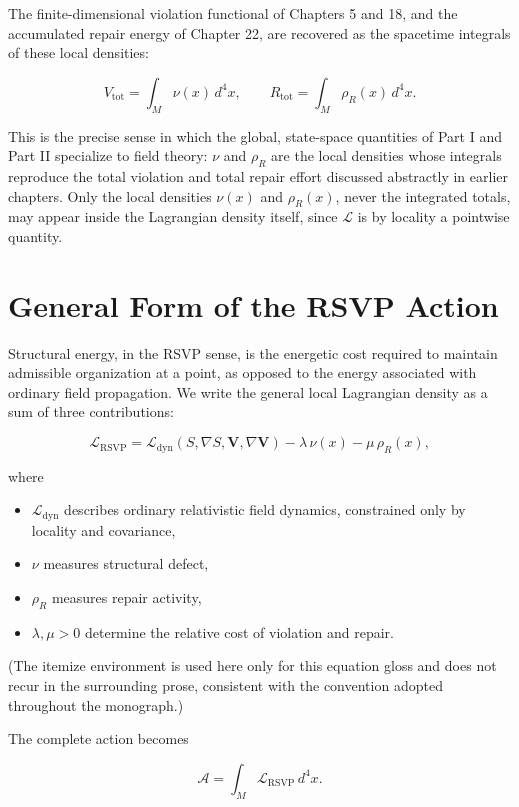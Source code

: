 \documentclass[11pt,oneside]{book}
\numberwithin{equation}{chapter}
\theoremstyle{definition}
\theoremstyle{plain}
\begin{document}
The finite-dimensional violation functional of Chapters 5 and 18, and the
accumulated repair energy of Chapter 22, are recovered as the spacetime
integrals of these local densities:

\[
\boxed{
V_{\mathrm{tot}}
=
\int_M \nu(x)\,d^4x,
\qquad
R_{\mathrm{tot}}
=
\int_M \rho_R(x)\,d^4x.
}
\]

This is the precise sense in which the global, state-space quantities of
Part I and Part II specialize to field theory: \(\nu\) and \(\rho_R\) are
the local densities whose integrals reproduce the total violation and total
repair effort discussed abstractly in earlier chapters. Only the local
densities \(\nu(x)\) and \(\rho_R(x)\), never the integrated totals, may
appear inside the Lagrangian density itself, since \(\mathcal L\) is by
locality a pointwise quantity.

\section{General Form of the RSVP Action}

Structural energy, in the RSVP sense, is the energetic cost required to
maintain admissible organization at a point, as opposed to the energy
associated with ordinary field propagation. We write the general local
Lagrangian density as a sum of three contributions:

\[
\boxed{
\mathcal L_{\mathrm{RSVP}}
=
\mathcal L_{\mathrm{dyn}}
\left(S,\nabla S,\mathbf V,\nabla\mathbf V\right)
-
\lambda\,\nu(x)
-
\mu\,\rho_R(x),
}
\]

where

\begin{itemize}
\item[] \(\mathcal L_{\mathrm{dyn}}\) describes ordinary relativistic field
dynamics, constrained only by locality and covariance,
\item[] \(\nu\) measures structural defect,
\item[] \(\rho_R\) measures repair activity,
\item[] \(\lambda,\mu>0\) determine the relative cost of violation and
repair.
\end{itemize}

(The itemize environment is used here only for this equation gloss and does
not recur in the surrounding prose, consistent with the convention adopted
throughout the monograph.)

The complete action becomes

\[
\mathcal A
=
\int_M
\mathcal L_{\mathrm{RSVP}}
\,d^4x.
\]
\end{document}
